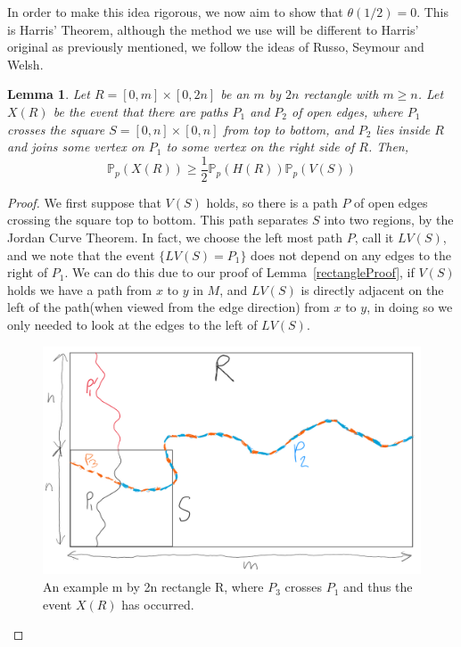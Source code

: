 \documentclass[a4paper,11pt]{article}
\newtheorem{lemma}[theorem]{Lemma}
\theoremstyle{definition}
\newcommand{\prob}{\mathbb{P}_p}
\begin{document}
In order to make this idea rigorous, we now aim to show that $\theta(1/2) = 0$. This is Harris' Theorem, although the method we use will be different to Harris' original as previously mentioned, we follow the ideas of Russo, Seymour and Welsh.

\begin{lemma}\label{mby2nLemma}
	Let $R = [0,m]\times[0,2n]$ be an $m$ by $2n$ rectangle with $m\geq n$. Let $X(R)$ be the event that there are paths $P_1$ and $P_2$ of open edges, where $P_1$ crosses the square $S = [0,n]\times[0,n]$ from top to bottom, and $P_2$ lies inside $R$ and joins some vertex on $P_1$ to some vertex on the right side of $R$. Then, 
	$$\prob(X(R))\geq \frac{1}{2}\prob(H(R))\prob(V(S))$$
\end{lemma}
\begin{proof}
	We first suppose that $V(S)$ holds, so there is a path $P$ of open edges crossing the square top to bottom. This path separates $S$ into two regions, by the Jordan Curve Theorem. In fact, we choose the left most path $P$, call it $LV(S)$, and we note that the event $\{LV(S) = P_1\}$ does not depend on any edges to the right of $P_1$. We can do this due to our proof of Lemma~\ref{rectangleProof}, if $V(S)$ holds we have a path from $x$ to $y$ in $M$, and $LV(S)$ is directly adjacent on the left of the path(when viewed from the edge direction) from $x$ to $y$, in doing so we only needed to look at the edges to the left of $LV(S)$.

	\begin{figure}
		\centering
		\includegraphics[scale=0.48]{drawings/2nbymRectangle.png}
		\caption{An example m by 2n rectangle R, where $P_3$ crosses $P_1$ and thus the event $X(R)$ has occurred.}
		\label{fig:2nbymProof}
	\end{figure}


\end{proof}
\end{document}
